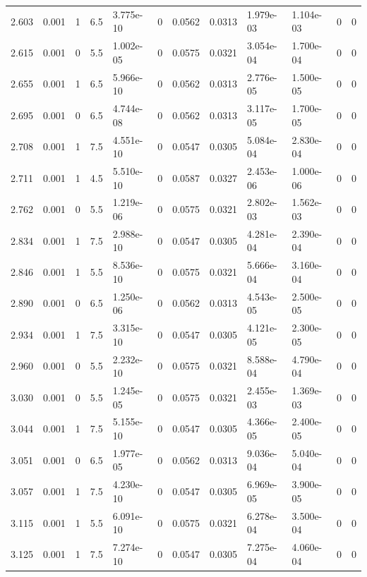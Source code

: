 \documentclass[preview]{standalone}
\begin{document}
{{{\begin{tabular}{L{1.2cm}C{1.2cm} C{0.3cm}C{0.5cm} C{1.4cm}C{1.4cm} C{1.4cm}C{1.4cm} C{1.6cm}C{1.6cm} C{1.6cm}C{1.6cm}}
  2.603  &  0.001  & 1     & 6.5 &  3.775e-10  & 0  &  0.0562&   0.0313& 1.979e-03 & 1.104e-03   &  0 & 0  \\ 
  2.615  &  0.001  & 0     & 5.5 &  1.002e-05  & 0  &  0.0575&   0.0321& 3.054e-04 & 1.700e-04   &  0 & 0  \\ 
  2.655  &  0.001  & 1     & 6.5 &  5.966e-10  & 0  &  0.0562&   0.0313& 2.776e-05 & 1.500e-05   &  0 & 0  \\ 
  2.695  &  0.001  & 0     & 6.5 &  4.744e-08  & 0  &  0.0562&   0.0313& 3.117e-05 & 1.700e-05   &  0 & 0  \\ 
  2.708  &  0.001  & 1     & 7.5 &  4.551e-10  & 0  &  0.0547&   0.0305& 5.084e-04 & 2.830e-04   &  0 & 0  \\ 
  2.711  &  0.001  & 1     & 4.5 &  5.510e-10  & 0  &  0.0587&   0.0327& 2.453e-06 & 1.000e-06   &  0 & 0  \\ 
  2.762  &  0.001  & 0     & 5.5 &  1.219e-06  & 0  &  0.0575&   0.0321& 2.802e-03 & 1.562e-03   &  0 & 0  \\ 
  2.834  &  0.001  & 1     & 7.5 &  2.988e-10  & 0  &  0.0547&   0.0305& 4.281e-04 & 2.390e-04   &  0 & 0  \\ 
  2.846  &  0.001  & 1     & 5.5 &  8.536e-10  & 0  &  0.0575&   0.0321& 5.666e-04 & 3.160e-04   &  0 & 0  \\ 
  2.890  &  0.001  & 0     & 6.5 &  1.250e-06  & 0  &  0.0562&   0.0313& 4.543e-05 & 2.500e-05   &  0 & 0  \\ 
  2.934  &  0.001  & 1     & 7.5 &  3.315e-10  & 0  &  0.0547&   0.0305& 4.121e-05 & 2.300e-05   &  0 & 0  \\ 
  2.960  &  0.001  & 0     & 5.5 &  2.232e-10  & 0  &  0.0575&   0.0321& 8.588e-04 & 4.790e-04   &  0 & 0  \\ 
  3.030  &  0.001  & 0     & 5.5 &  1.245e-05  & 0  &  0.0575&   0.0321& 2.455e-03 & 1.369e-03   &  0 & 0  \\ 
  3.044  &  0.001  & 1     & 7.5 &  5.155e-10  & 0  &  0.0547&   0.0305& 4.366e-05 & 2.400e-05   &  0 & 0  \\ 
  3.051  &  0.001  & 0     & 6.5 &  1.977e-05  & 0  &  0.0562&   0.0313& 9.036e-04 & 5.040e-04   &  0 & 0  \\ 
  3.057  &  0.001  & 1     & 7.5 &  4.230e-10  & 0  &  0.0547&   0.0305& 6.969e-05 & 3.900e-05   &  0 & 0  \\ 
  3.115  &  0.001  & 1     & 5.5 &  6.091e-10  & 0  &  0.0575&   0.0321& 6.278e-04 & 3.500e-04   &  0 & 0  \\ 
  3.125  &  0.001  & 1     & 7.5 &  7.274e-10  & 0  &  0.0547&   0.0305& 7.275e-04 & 4.060e-04   &  0 & 0  \\ 

\end{tabular}}}}
\end{document}
